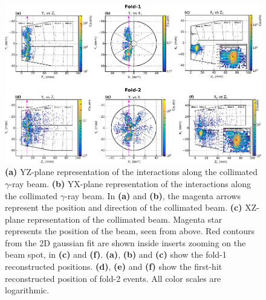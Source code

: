 \begin{figure}[htb]
\includegraphics[width=\textwidth]{images/superimposed_D10,0_-9,0_fold2_HitIndex1_AND_fold1_3subplots_with_fit.pdf}
     \caption{\textbf{(a)} YZ-plane representation of the interactions along the collimated $\gamma$-ray beam. \textbf{(b)} YX-plane representation of the interactions along the collimated $\gamma$-ray beam. In \textbf{(a)} and \textbf{(b)}, the magenta arrows represent the position and direction of the collimated beam. \textbf{(c)} XZ-plane representation of the collimated beam. Magenta star represents the position of the beam, seen from above. Red contours from the 2D gaussian fit are shown inside inserts zooming on the beam spot, in \textbf{(c)} and \textbf{(f)}. \textbf{(a)}, \textbf{(b)} and \textbf{(c)} show the fold-1 reconstructed positions. \textbf{(d)}, \textbf{(e)} and \textbf{(f)} show the first-hit reconstructed position of fold-2 events. All color scales are logarithmic.}
\label{fig:H_beam_10.0_-9.0_fold2_HitIndex1_and_fold1}       %
\end{figure}


